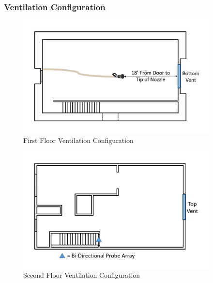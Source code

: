 \documentclass{article}
\begin{document}
\subsubsection{Ventilation Configuration}

\begin{figure}[!ht]
	\centering
	\includegraphics[width=4in]{Figures/Air_Entrainment/Measurement_Location_VentConfig_Bottom.jpg}
	\caption{First Floor Ventilation Configuration}
	\label{fig:First_Floor_Ventilation_Configuration}
\end{figure}

\begin{figure}[!ht]
	\centering
	\includegraphics[width=4in]{Figures/Air_Entrainment/Measurement_Location_VentConfig_Top.jpg}
	\caption{Second Floor Ventilation Configuration}
	\label{fig:Second_Floor_Ventilation_Configuration}
\end{figure}
\end{document}
